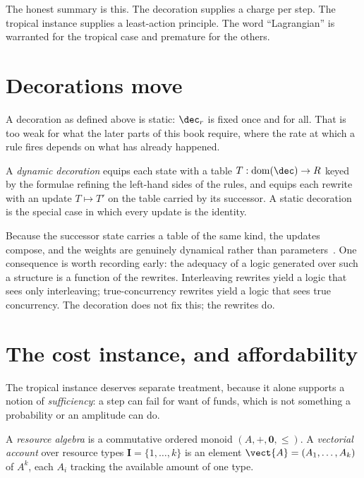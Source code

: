 The honest summary is this.  The decoration supplies a charge per step.
The tropical instance supplies a least-action principle.  The word
``Lagrangian'' is warranted for the tropical case and premature for the
others.

\section{Decorations move}

A decoration as defined above is static: $\dec_r$ is fixed once and for
all.  That is too weak for what the later parts of this book require,
where the rate at which a rule fires depends on what has already happened.

\begin{definition}
\label{def:dyndec}
A \emph{dynamic decoration} equips each state with a table
$T : \mathrm{dom}(\dec) \to R$ keyed by the formulae refining the
left-hand sides of the rules, and equips each rewrite with an update
$T \mapsto T'$ on the table carried by its successor.  A static decoration
is the special case in which every update is the identity.
\end{definition}

Because the successor state carries a table of the same kind, the updates
compose, and the weights are genuinely dynamical rather than
parameters~\cite{StochSim}.  One consequence is worth recording early:
the adequacy of a logic generated over such a structure is a function of
the rewrites.  Interleaving rewrites yield a logic that sees only
interleaving; true-concurrency rewrites yield a logic that sees true
concurrency.  The decoration does not fix this; the rewrites do.

\section{The cost instance, and affordability}

The tropical instance deserves separate treatment, because it alone
supports a notion of \emph{sufficiency}: a step can fail for want of
funds, which is not something a probability or an amplitude can do.

\begin{definition}
A \emph{resource algebra} is a commutative ordered monoid
$(A, +, \mathbf{0}, \leq)$.  A \emph{vectorial account} over resource
types $\mathbf{I} = \{1,\ldots,k\}$ is an element
$\vect{A} = (A_1,\ldots,A_k)$ of $A^k$, each $A_i$ tracking the available
amount of one type.
\end{definition}

